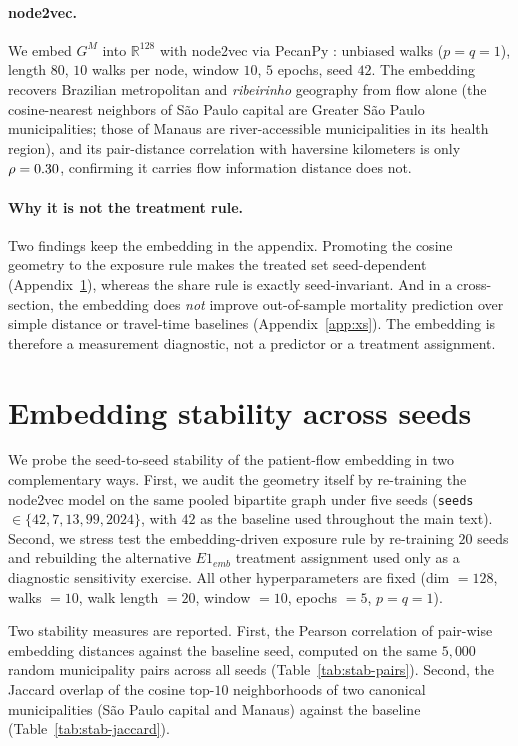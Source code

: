 \paragraph{node2vec.} We embed $G^M$ into $\mathbb{R}^{128}$ with node2vec
\citep{grover2016} via PecanPy \citep{liu2021pecanpy}: unbiased walks
($p=q=1$), length $80$, $10$ walks per node, window $10$, $5$ epochs,
seed $42$. The embedding recovers Brazilian metropolitan and
\emph{ribeirinho} geography from flow alone (the cosine-nearest neighbors
of São Paulo capital are Greater São Paulo municipalities; those of
Manaus are river-accessible municipalities in its health region), and its
pair-distance correlation with haversine kilometers is only
$\rho = 0.30$, confirming it carries flow information distance does not.

\paragraph{Why it is not the treatment rule.} Two findings keep the
embedding in the appendix. Promoting the cosine geometry to the exposure
rule makes the treated set seed-dependent (Appendix~\ref{app:stability}),
whereas the share rule is exactly seed-invariant. And in a cross-section,
the embedding does \emph{not} improve out-of-sample mortality prediction
over simple distance or travel-time baselines (Appendix~\ref{app:xs}).
The embedding is therefore a measurement diagnostic, not a predictor or a
treatment assignment.

\section{Embedding stability across seeds}
\label{app:stability}

We probe the seed-to-seed stability of the patient-flow embedding in
two complementary ways. First, we audit the geometry itself by
re-training the node2vec model on the same pooled bipartite graph
under five seeds (\texttt{seeds} $\in \{42, 7, 13, 99, 2024\}$, with
$42$ as the baseline used throughout the main text). Second, we stress
test the embedding-driven exposure rule by re-training $20$ seeds and
rebuilding the alternative $E1_{emb}$ treatment assignment used only as
a diagnostic sensitivity exercise. All other hyperparameters are fixed (dim
$= 128$, walks $= 10$, walk length $= 20$, window $= 10$, epochs $= 5$,
$p = q = 1$).

Two stability measures are reported. First, the Pearson correlation of
pair-wise embedding distances against the baseline seed,
computed on the same $5{,}000$ random municipality pairs across all
seeds (Table~\ref{tab:stab-pairs}). Second, the Jaccard overlap of
the cosine top-$10$ neighborhoods of two canonical municipalities
(São Paulo capital and Manaus) against the baseline
(Table~\ref{tab:stab-jaccard}).

